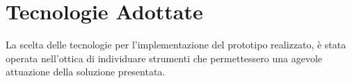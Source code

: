 \chapter{Tecnologie Adottate}

La scelta delle tecnologie per l'implementazione del prototipo realizzato, è stata operata nell'ottica di individuare strumenti che permettessero una agevole attuazione della soluzione presentata.
